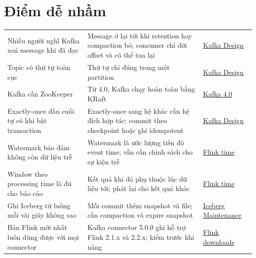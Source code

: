 \section{Điểm dễ nhầm}
\begin{xltabular}{\textwidth}{@{}P{4.0cm} L P{3.2cm}@{}}
\toprule
{} &  &  \\
\midrule
\endhead
\bottomrule
\endfoot
Nhiều người nghĩ Kafka xoá message khi đã đọc & Message ở lại tới khi retention hay compaction bỏ; consumer chỉ dời offset và có thể tua lại & \href{https://kafka.apache.org/44/design/design/}{Kafka Design} \\
Topic có thứ tự toàn cục & Thứ tự chỉ đúng trong một partition & \href{https://kafka.apache.org/44/design/design/}{Kafka Design} \\
Kafka cần ZooKeeper & Từ 4.0, Kafka chạy hoàn toàn bằng KRaft & \href{https://kafka.apache.org/blog/2025/03/18/apache-kafka-4.0.0-release-announcement/}{Kafka 4.0} \\
Exactly-once đầu cuối tự có khi bật transaction & Exactly-once sang hệ khác cần hệ đích hợp tác: commit theo checkpoint hoặc ghi idempotent & \href{https://kafka.apache.org/44/design/design/}{Kafka Design} \\
Watermark bảo đảm không còn dữ liệu trễ & Watermark là ước lượng tiến độ event time; vẫn cần chính sách cho sự kiện trễ & \href{https://nightlies.apache.org/flink/flink-docs-stable/docs/concepts/time/}{Flink time} \\
Window theo processing time là đủ cho báo cáo & Kết quả khi đó phụ thuộc lúc dữ liệu tới; phát lại cho kết quả khác & \href{https://nightlies.apache.org/flink/flink-docs-stable/docs/concepts/time/}{Flink time} \\
Ghi Iceberg từ luồng mỗi vài giây không sao & Mỗi commit thêm snapshot và file; cần compaction và expire snapshot & \href{https://iceberg.apache.org/docs/latest/maintenance/}{Iceberg Maintenance} \\
Bản Flink mới nhất luôn dùng được với mọi connector & Kafka connector 5.0.0 ghi hỗ trợ Flink 2.1.x và 2.2.x; kiểm trước khi nâng & \href{https://flink.apache.org/downloads/}{Flink downloads} \\
\end{xltabular}
